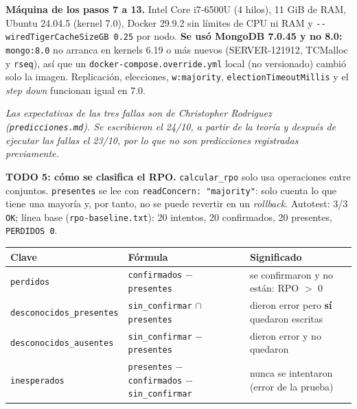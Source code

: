 \documentclass[10pt,letterpaper]{article}
\begin{document}
\textbf{Máquina de los pasos 7 a 13.} Intel Core i7-6500U (4 hilos), 11 GiB de RAM, Ubuntu 24.04.5
(kernel 7.0), Docker 29.9.2 sin límites de CPU ni RAM y \texttt{-{}-wiredTigerCacheSizeGB 0.25} por nodo.
\textbf{Se usó MongoDB 7.0.45 y no 8.0:} \texttt{mongo:8.0} no arranca en kernels 6.19 o más nuevos
(SERVER-121912, TCMalloc y \texttt{rseq}), así que un \texttt{docker-compose.override.yml} local (no
versionado) cambió solo la imagen. Replicación, elecciones, \texttt{w:majority},
\texttt{electionTimeoutMillis} y el \emph{step down} funcionan igual en 7.0.

\emph{Las expectativas de las tres fallas son de Christopher Rodriguez (\texttt{predicciones.md}). Se escribieron el
24/10, a partir de la teoría y después de ejecutar las fallas el 23/10, por lo que no son predicciones
registradas previamente.}

\textbf{TODO 5: cómo se clasifica el RPO.} \texttt{calcular\_rpo} solo usa operaciones entre conjuntos.
\texttt{presentes} se lee con \texttt{readConcern: "majority"}: solo cuenta lo que tiene una mayoría y,
por tanto, no se puede revertir en un \emph{rollback}. Autotest: 3/3 \texttt{OK}; línea base
(\texttt{rpo-baseline.txt}): 20 intentos, 20 confirmados, 20 presentes, \texttt{PERDIDOS 0}.

\begin{center}\footnotesize
\begin{tabular}{@{}lll@{}}
\toprule
\textbf{Clave} & \textbf{Fórmula} & \textbf{Significado} \\
\midrule
\texttt{perdidos} & \texttt{confirmados} $-$ \texttt{presentes} & se confirmaron y no están: RPO $>$ 0 \\
\texttt{desconocidos\_presentes} & \texttt{sin\_confirmar} $\cap$ \texttt{presentes} & dieron error pero \textbf{sí} quedaron escritas \\
\texttt{desconocidos\_ausentes} & \texttt{sin\_confirmar} $-$ \texttt{presentes} & dieron error y no quedaron \\
\texttt{inesperados} & \texttt{presentes} $-$ \texttt{confirmados} $-$ \texttt{sin\_confirmar} & nunca se intentaron (error de la prueba) \\
\bottomrule
\end{tabular}
\end{center}
\end{document}
